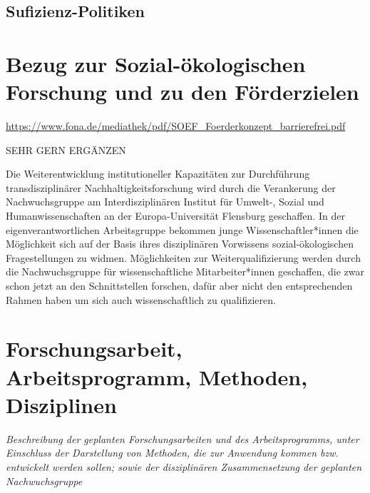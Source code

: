 \documentclass[a4paper,11pt,twoside]{scrartcl}
\begin{document}
\subsection*{Sufizienz-Politiken}


\section{Bezug zur Sozial-ökologischen Forschung und zu den Förderzielen}

\url{https://www.fona.de/mediathek/pdf/SOEF_Foerderkonzept_barrierefrei.pdf}

SEHR GERN ERGÄNZEN


Die Weiterentwicklung institutioneller Kapazitäten zur Durchführung transdisziplinärer Nachhaltigkeitsforschung wird durch die Verankerung der Nachwuchsgruppe am Interdisziplinären Institut für Umwelt-, Sozial und Humanwissenschaften an der Europa-Universität Flensburg geschaffen. In der eigenverantwortlichen Arbeitsgruppe bekommen junge Wissenschaftler*innen die Möglichkeit sich auf der Basis ihres disziplinären Vorwissens sozial-ökologischen Fragestellungen zu  widmen. Möglichkeiten zur Weiterqualifizierung werden durch die  Nachwuchsgruppe für wissenschaftliche Mitarbeiter*innen geschaffen, die zwar schon jetzt an den Schnittstellen forschen, dafür aber nicht den entsprechenden Rahmen haben um sich auch wissenschaftlich zu qualifizieren.


\section{Forschungsarbeit, Arbeitsprogramm, Methoden, Disziplinen}
\textit{Beschreibung der geplanten Forschungsarbeiten und des Arbeitsprogramms, unter Einschluss der Darstellung von Methoden, die zur Anwendung kommen bzw. entwickelt werden sollen; sowie der disziplinären Zusammensetzung der geplanten Nachwuchsgruppe}

\end{document}

